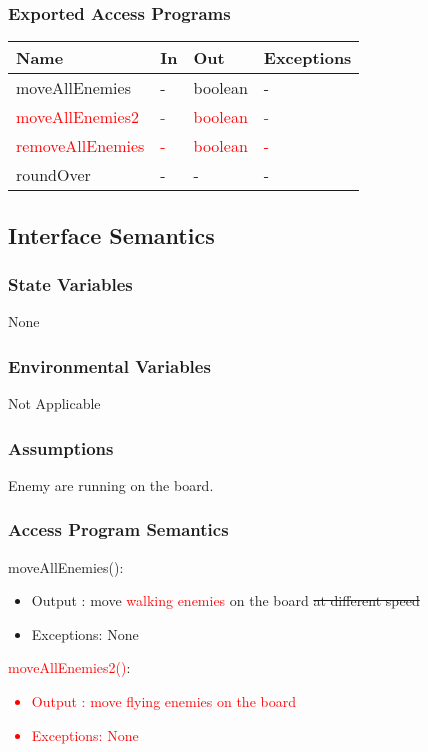 \documentclass[12,english]{article}
\begin{document}
\subsubsection{Exported Access Programs}
\begin{table}[h!]
    \centering
    \begin{tabular}{|p{4cm}|p{2cm}|p{2cm}|p{2cm}|}
    \hline
    \textbf {Name}  & {In} & {Out} & {Exceptions} \\
    \hline
    moveAllEnemies & - & boolean & -\\
    \hline
    \textcolor{red}{moveAllEnemies2} & \textcolor{red}{-} & \textcolor{red}{boolean} & \textcolor{red}{-}\\
    \hline
    \textcolor{red}{removeAllEnemies} & \textcolor{red}{-} & \textcolor{red}{boolean} & \textcolor{red}{-}\\
    \hline
    roundOver & - & - & - \\
    \hline 
    \end{tabular}
\end{table}

\subsection{Interface Semantics}
\subsubsection{State Variables}
None
\subsubsection{Environmental Variables}
Not Applicable
\subsubsection{Assumptions}
Enemy are running on the board. 
\subsubsection{Access Program Semantics}

\noindent moveAllEnemies():
\begin{itemize}
    \item Output : move \textcolor{red}{walking enemies} on the board \st{at different speed}
    \item Exceptions: None
\end{itemize}

\noindent \textcolor{red}{moveAllEnemies2()}:
\textcolor{red}{\begin{itemize}
    \item Output : move flying enemies on the board 
    \item Exceptions: None
\end{itemize}}
\end{document}
